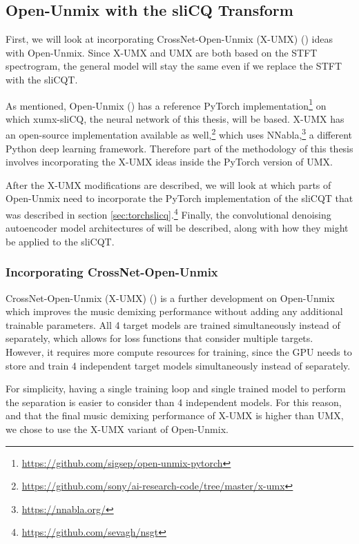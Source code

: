 \documentclass[report.tex]{subfiles}
\begin{document}
\newpagefill

\subsection{Open-Unmix with the sliCQ Transform}
\label{sec:slicqumx}

First, we will look at incorporating CrossNet-Open-Unmix (X-UMX) (\cite{xumx}) ideas with Open-Unmix. Since X-UMX and UMX are both based on the STFT spectrogram, the general model will stay the same even if we replace the STFT with the sliCQT.

As mentioned, Open-Unmix (\cite{umx}) has a reference PyTorch implementation\footnote{\url{https://github.com/sigsep/open-unmix-pytorch}} on which xumx-sliCQ, the neural network of this thesis, will be based. X-UMX has an open-source implementation available as well,\footnote{\url{https://github.com/sony/ai-research-code/tree/master/x-umx}} which uses NNabla,\footnote{\url{https://nnabla.org/}} a different Python deep learning framework. Therefore part of the methodology of this thesis involves incorporating the X-UMX ideas inside the PyTorch version of UMX.

After the X-UMX modifications are described, we will look at which parts of Open-Unmix need to incorporate the PyTorch implementation of the sliCQT that was described in section \ref{sec:torchslicq}.\footnote{\url{https://github.com/sevagh/nsgt}} Finally, the convolutional denoising autoencoder model architectures of \textcite{plumbley1, plumbley2}  will be described, along with how they might be applied to the sliCQT.

\subsubsection{Incorporating CrossNet-Open-Unmix}
\label{sec:xumxinc}

CrossNet-Open-Unmix (X-UMX) (\cite{xumx}) is a further development on Open-Unmix which improves the music demixing performance without adding any additional trainable parameters. All 4 target models are trained simultaneously instead of separately, which allows for loss functions that consider multiple targets. However, it requires more compute resources for training, since the GPU needs to store and train 4 independent target models simultaneously instead of separately.

For simplicity, having a single training loop and single trained model to perform the separation is easier to consider than 4 independent models. For this reason, and that the final music demixing performance of X-UMX is higher than UMX, we chose to use the X-UMX variant of Open-Unmix.
\end{document}
